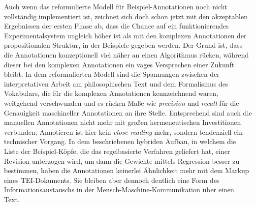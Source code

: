 \documentclass{article}
\newcommand*{\englisch}[1]{\foreignlanguage{english}{\textit{#1}}}%
\begin{document}
Auch wenn das reformulierte Modell für Beispiel-Annotationen noch
nicht vollständig implementiert ist, zeichnet sich doch schon jetzt
mit den akzeptablen Ergebnissen der ersten Phase ab, dass die Chance
auf ein funktionierendes Experimentalsystem ungleich höher ist als mit
den komplexen Annotationen der propositionalen Struktur, in der
Beispiele gegeben werden. Der Grund ist, dass die Annotationen
konzeptionell viel näher an einen Algorithmus rücken, während dieser
bei den komplexen Annotationen ein vages Versprechen einer Zukunft
bleibt. In dem reformulierten Modell sind die Spannungen zwischen der
interpretativen Arbeit am philosophischen Text und dem Formalismus des
Vokabulars, die für die komplexen Annotationen kennzeichnend waren,
weitgehend verschwunden und es rücken Maße wie \englisch{precision}
und \englisch{recall} für die Genauigkeit maschineller Annotationen an
ihre Stelle. Entsprechend sind auch die manuellen Annotationen nicht
mehr mit großen hermeneutischen Investitionen verbunden; Annotieren
ist hier kein \englisch{close reading} mehr, sondern tendenziell ein
technischer Vorgang. In dem beschriebenen hybriden Aufbau, in welchem
die Liste der Beispiel-Köpfe, die das regelbasierte Verfahren
geliefert hat, einer Revision unterzogen wird, um dann die Gewichte
mittels Regression besser zu bestimmen, haben die Annotationen
keinerlei Ähnlichkeit mehr mit dem Markup eines TEI-Dokuments. Sie
bleiben aber dennoch deutlich eine Form des Informationsaustauschs in
der Mensch-Maschine-Kommunikation über einen Text.

\printbibliography



\end{document}
